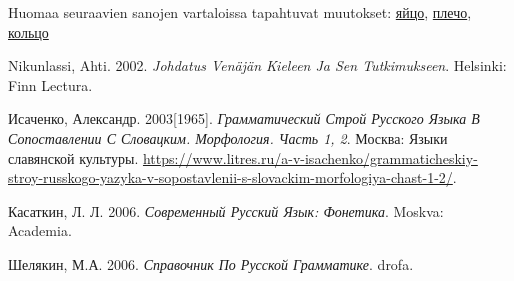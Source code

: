\documentclass[]{scrartcl}
\begin{document}
Huomaa seuraavien sanojen vartaloissa tapahtuvat muutokset:
\href{http://ru.wiktionary.org/wiki/яйцо}{яйцо},
\href{http://ru.wiktionary.org/wiki/плечо}{плечо},
\href{http://ru.wiktionary.org/wiki/кольцо}{кольцо}

Nikunlassi, Ahti. 2002. \emph{Johdatus Venäjän Kieleen Ja Sen
Tutkimukseen}. Helsinki: Finn Lectura.

Исаченко, Александр. 2003{[}1965{]}. \emph{Грамматический Строй Русского
Языка В Сопоставлении С Словацким. Морфология. Часть 1, 2}. Москва:
Языки славянской культуры.
\url{https://www.litres.ru/a-v-isachenko/grammaticheskiy-stroy-russkogo-yazyka-v-sopostavlenii-s-slovackim-morfologiya-chast-1-2/}.

Касаткин, Л. Л. 2006. \emph{Современный Русский Язык: Фонетика}. Moskva:
Academia.

Шелякин, М.А. 2006. \emph{Справочник По Русской Грамматике}. drofa.
\end{document}
